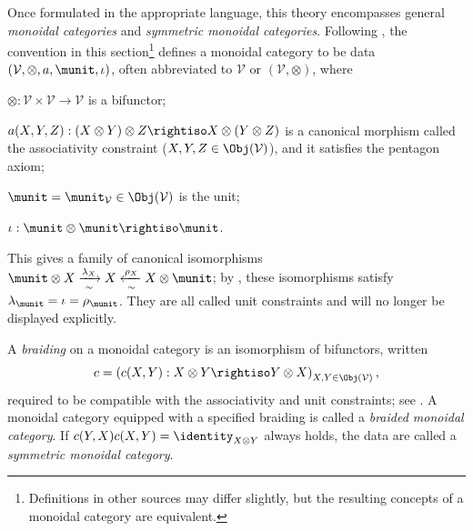 Once formulated in the appropriate language, this theory encompasses general
\emph{monoidal categories} and \emph{symmetric monoidal categories}.
Following \cite[Definitions 3.1.1 and 3.1.2]{Li1}, the convention in this
section\footnote{Definitions in other sources may differ slightly, but the
resulting concepts of a monoidal category are equivalent.} defines a monoidal
category to be data $(\mathcal{V},\otimes,a,\munit,\iota)$, often abbreviated
to $\mathcal{V}$ or $(\mathcal{V},\otimes)$, where
\begin{compactitem}
	\item $\otimes: \mathcal{V} \times \mathcal{V} \to \mathcal{V}$ is a bifunctor;
	\item $a(X, Y, Z): (X \otimes Y) \otimes Z \rightiso X \otimes (Y \otimes Z)$ is a canonical morphism called the associativity constraint ($X, Y, Z \in \Obj(\mathcal{V})$), and it satisfies the pentagon axiom;
	\item $\munit = \munit_{\mathcal{V}} \in \Obj(\mathcal{V})$ is the unit;
	\item $\iota: \munit \otimes \munit \rightiso \munit$.
\end{compactitem}
This gives a family of canonical isomorphisms
$\munit \otimes X \xrightarrow[\sim]{\lambda_X} X \xleftarrow[\sim]{\rho_X} X \otimes \munit$;
by \cite[Lemma 3.1.5]{Li1}, these isomorphisms satisfy
$\lambda_{\munit}=\iota=\rho_{\munit}$. They are all called unit constraints
and will no longer be displayed explicitly.

A \emph{braiding} on a monoidal category is an isomorphism of bifunctors,
written
\[ c = \left( c(X, Y): X \otimes Y \rightiso Y \otimes X\right)_{X, Y \in \Obj(\mathcal{V})}, \]
required to be compatible with the associativity and unit constraints; see
\cite[Definition 3.3.1]{Li1}. A monoidal category equipped with a specified
braiding is called a \emph{braided monoidal category}. If
$c(Y,X)c(X,Y)=\identity_{X\otimes Y}$ always holds, the data are called a
\emph{symmetric monoidal category}.

